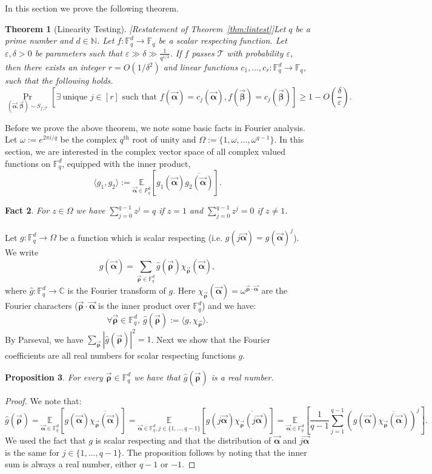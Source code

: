 \documentclass[11pt]{article}
\newcommand{\F}{\mathbb{F}}
\renewcommand{\ge}{ \geqslant}
\newtheorem{theorem}{Theorem}[section]
\newtheorem{proposition}[theorem]{Proposition}
\newtheorem{fact}[theorem]{Fact}
\renewcommand{\epsilon}{\varepsilon}
\newcommand{\alphab}{\vec{\bm{\alpha}}}
\newcommand{\betab}{\vec{\bm{\beta}}}
\newcommand{\rhob}{\vec{\bm{\rho}}}
\begin{document}
In this section we prove the following theorem. 

\begin{theorem}[Linearity Testing][Restatement of Theorem~\ref{thm:lintest}]\label{thm:linearitytest}
Let $q$ be a prime number and $d\in \mathbb{N}$.
Let $f:\F_q^d\to\F_q$ be a scalar respecting function. Let $\epsilon, \delta > 0$ be parameters such that 
$\epsilon \gg \delta \gg \frac{1}{q^{1/3}}$. 
If $f$  passes $\mathcal{T}$ with probability $\varepsilon$, then  there exists an integer $r = O(1/\delta^2)$ and 
\emph{linear} functions $c_1,\ldots ,c_r:\F_q^d\to\F_q$, such that the following holds.
$$
\underset{ (\alphab, \betab) \sim S_{f,\mathcal{T}} }{\Pr}\left[\exists\ \text{unique } j\in[r] \text{ such that }f(\alphab)=c_j(\alphab),
 f(\betab)=c_j(\betab) \right]\ge 1- O\left(\frac{\delta}{\epsilon}\right).
$$
\end{theorem}

Before we prove the above theorem, we note some basic facts in Fourier analysis.  
Let $\omega:=e^{2\pi i/q}$ be the complex $q^{\text{th}}$ root of unity and $\Omega :=\{1,\omega,\ldots,\omega^{q-1}\}$.
In this section, we are interested in the complex vector space of all complex valued functions on $\F_q^d$, equipped with the inner product,
$$
\langle g_1,g_2\rangle:=\underset{\alphab\in F_q^d}{\mathbb{E}}[g_1(\alphab)\overline{g_2(\alphab)}].
$$

%
\begin{fact}\label{fact}
For  $z\in\Omega$ we have $\sum_{j=0}^{q-1} z^{j}=q$ if $z=1$ and  $\sum_{j=0}^{q-1} z^{j}=0$ if $z\neq 1$.
\end{fact}

Let $g:\F_q^d\to\Omega$ be a function which is scalar respecting (i.e. $g(j \alphab) = g(\alphab)^j$).  We write $$g(\alphab) = \underset{\rhob\in\F_q^d}{\sum}\hat{g}(\rhob)\chi_{\rhob}(\alphab),$$ 
where $\hat{g}:\F_q^d\to \mathbb{C}$ is the Fourier transform of $g$. Here 
$\chi_{\rhob}(\alphab) = \omega^{\rhob \cdot \alphab}$ are the Fourier characters ($\rhob \cdot \alphab$ is the inner product over $\F_q^d$)
 and we have:
$$
\forall \rhob\in\F_q^d,\ \hat{g}(\rhob):= \langle g,\chi_{\rhob}\rangle.
$$
By Parseval, we have $\sum_{\rhob} |\hat{g}(\rhob)|^2 =1$. 
Next we show that the Fourier coefficients are all real numbers for scalar respecting functions $g$. 

\begin{proposition}
For every $\rhob\in\F_q^d$ we have that $\hat{g}(\rhob)$ is a real number.
\end{proposition}\begin{proof} We note that:
$$
\hat{g}(\rhob) 
=\underset{\alphab\in\F_q^d}{\mathbb{E}}[g(\alphab)\overline{\chi_{\rhob}(\alphab)}]
= \underset{\alphab\in\F_q^d, j \in \{1,\ldots,q-1\}}{\mathbb{E}}[g(j\alphab)\overline{\chi_{\rhob}(j\alphab)}]
= \underset{\alphab\in\F_q^d }{\mathbb{E}}\left[ \frac{1}{q-1} \sum_{j=1}^{q-1}  (g(\alphab)\overline{\chi_{\rhob}(\alphab)})^j\right].  
$$
We used the fact that $g$ is scalar respecting and that the distribution of
$\alphab$ and $j \alphab$ is the same for $j \in \{1,\ldots,q-1\}$. The proposition follows by noting that 
the inner sum is always a real number, either $q-1$ or $-1$. 
%
%
%
%
%
%
%
\end{proof}
\end{document}
